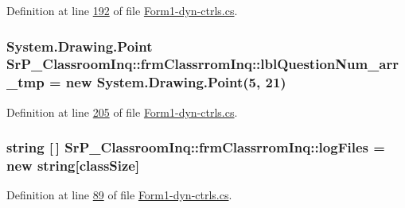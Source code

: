 \-Definition at line \hyperlink{_form1-dyn-ctrls_8cs_source_l00192}{192} of file \hyperlink{_form1-dyn-ctrls_8cs_source}{\-Form1-\/dyn-\/ctrls.\-cs}.

\hypertarget{class_sr_p___classroom_inq_1_1frm_classrrom_inq_a9af0d3cc5171be1c8b01ea1e208d61ee}{
\subsubsection[{lbl\-Question\-Num\-\_\-arr\-\_\-tmp}]{\setlength{\rightskip}{0pt plus 5cm}\-System.\-Drawing.\-Point {\bf \-Sr\-P\-\_\-\-Classroom\-Inq\-::frm\-Classrrom\-Inq\-::lbl\-Question\-Num\-\_\-arr\-\_\-tmp} = new \-System.\-Drawing.\-Point(5, 21)}}
\label{class_sr_p___classroom_inq_1_1frm_classrrom_inq_a9af0d3cc5171be1c8b01ea1e208d61ee}


\-Definition at line \hyperlink{_form1-dyn-ctrls_8cs_source_l00205}{205} of file \hyperlink{_form1-dyn-ctrls_8cs_source}{\-Form1-\/dyn-\/ctrls.\-cs}.

\hypertarget{class_sr_p___classroom_inq_1_1frm_classrrom_inq_a1b23b6935997df29f1b06ed831495076}{
\subsubsection[{log\-Files}]{\setlength{\rightskip}{0pt plus 5cm}string \mbox{[}$\,$\mbox{]} {\bf \-Sr\-P\-\_\-\-Classroom\-Inq\-::frm\-Classrrom\-Inq\-::log\-Files} = new string\mbox{[}{\bf class\-Size}\mbox{]}}}
\label{class_sr_p___classroom_inq_1_1frm_classrrom_inq_a1b23b6935997df29f1b06ed831495076}


\-Definition at line \hyperlink{_form1-dyn-ctrls_8cs_source_l00089}{89} of file \hyperlink{_form1-dyn-ctrls_8cs_source}{\-Form1-\/dyn-\/ctrls.\-cs}.

